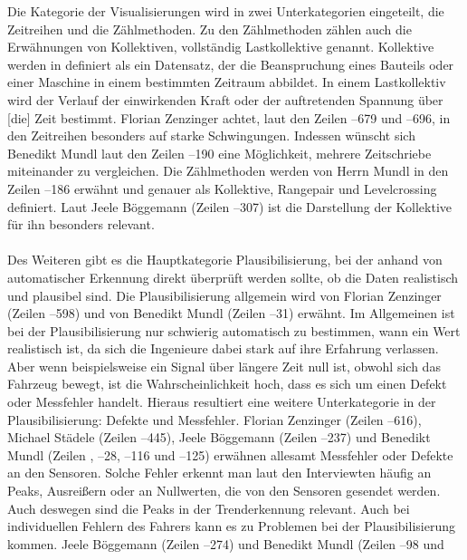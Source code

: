Die Kategorie der Visualisierungen wird in zwei Unterkategorien eingeteilt, die Zeitreihen und die Zählmethoden. Zu den Zählmethoden zählen auch die Erwähnungen von \glqq Kollektiven\grqq{}, vollständig Lastkollektive genannt. Kollektive werden in \cite{Jacobs.2016} definiert als \glqq ein Datensatz, der die Beanspruchung eines Bauteils oder einer Maschine in einem bestimmten Zeitraum abbildet. In einem Lastkollektiv wird der Verlauf der einwirkenden Kraft oder der auftretenden Spannung über [die] Zeit bestimmt\grqq{}. Florian Zenzinger achtet, laut den Zeilen --679 und --696, in den Zeitreihen besonders auf starke Schwingungen. Indessen wünscht sich Benedikt Mundl laut den Zeilen --190 eine Möglichkeit, mehrere Zeitschriebe miteinander zu vergleichen. Die Zählmethoden werden von Herrn Mundl in den Zeilen --186 erwähnt und genauer als Kollektive, Rangepair und Levelcrossing definiert. Laut Jeele Böggemann (Zeilen --307) ist die Darstellung der Kollektive für ihn besonders relevant. \\\\ Des Weiteren gibt es die Hauptkategorie Plausibilisierung, bei der anhand von automatischer Erkennung direkt überprüft werden sollte, ob die Daten  realistisch und plausibel sind. Die Plausibilisierung allgemein wird von Florian Zenzinger (Zeilen --598) und von Benedikt Mundl (Zeilen --31) erwähnt. Im Allgemeinen ist bei der Plausibilisierung nur schwierig automatisch zu bestimmen, wann ein Wert realistisch ist, da sich die Ingenieure dabei stark auf ihre Erfahrung verlassen. Aber wenn beispielsweise ein Signal über längere Zeit null ist, obwohl sich das Fahrzeug  bewegt, ist die Wahrscheinlichkeit hoch, dass es sich um einen Defekt oder Messfehler handelt. Hieraus resultiert eine weitere Unterkategorie in der Plausibilisierung: Defekte und Messfehler. Florian Zenzinger (Zeilen --616), Michael Städele (Zeilen --445), Jeele Böggemann (Zeilen --237) und Benedikt Mundl (Zeilen , --28, --116 und --125) erwähnen allesamt Messfehler oder Defekte an den Sensoren. Solche Fehler erkennt man laut den Interviewten häufig an Peaks, Ausreißern oder an Nullwerten, die von den Sensoren gesendet werden. Auch deswegen sind die Peaks in der Trenderkennung  relevant. Auch bei individuellen Fehlern des Fahrers kann es zu Problemen bei der Plausibilisierung kommen. Jeele Böggemann (Zeilen --274) und Benedikt Mundl (Zeilen --98 und 